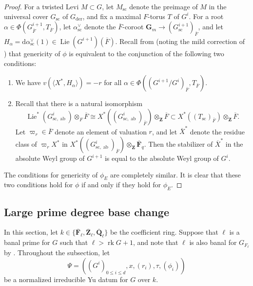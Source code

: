 \documentclass[reqno]{amsart}
\numberwithin{equation}{subsection}
\newcommand{\F}{\mathbf{F}}
\newcommand{\G}{\mathbf{G}}
\newcommand{\Q}{\mathbf{Q}}
\newcommand{\Z}{\mathbf{Z}}
\newcommand{\ol}[1]{\overline{#1}}
\DeclareMathOperator{\ab}{ab}
\DeclareMathOperator{\Lie}{Lie}
\DeclareMathOperator{\der}{der}
\DeclareMathOperator{\rk}{rk}
\DeclareMathOperator{\Fr}{Fr}
\theoremstyle{remark}
\numberwithin{equation}{subsection}
\numberwithin{figure}{subsection}
\begin{document}
\begin{proof}
For a twisted Levi $M \subset G$, let $M_{\mathrm{sc}}$ denote the preimage of $M$ in the universal cover $G_{\mathrm{sc}}$ of $G_{\der}$, and fix a maximal $F$-torus $T$ of $G^i$. For a root $\alpha \in \Phi(G^{i+1}_{\ol F}, T_{\ol F})$, let $\alpha_{\mathrm{sc}}^\vee$ denote the $\ol F$-coroot $\G_m \to (G^{i+1}_{\mathrm{sc}})_{\ol F}$, and let $H_\alpha = \mathrm{d}\alpha_{\mathrm{sc}}^\vee(1) \in \Lie(G^{i+1})(\ol F)$. Recall from \cite[\S 8]{Yu01} (noting the mild correction of \cite[Remark 4.1.3]{FKS23}) that genericity of $\phi$ is equivalent to the conjunction of the following two conditions:
\begin{enumerate}
    \item We have $v(\langle X^*, H_\alpha\rangle) = -r$ for all $\alpha \in \Phi((G^{i+1}/G^i)_{\ol F}, T_{\ol F})$.
    \item Recall that there is a natural isomorphism
    \[
    \Lie^*(G^i_{\mathrm{sc},\ab}) \otimes_F \ol F \cong X^*((G^i_{\mathrm{sc},\ab})_{\ol F}) \otimes_{\Z} \ol F \subset X^*((T_{\mathrm{sc}})_{\ol F}) \otimes_{\Z} \ol F.
    \]
    Let $\varpi_r \in \ol F$ denote an element of valuation $r$, and let $\ol X^*$ denote the residue class of $\varpi_r X^*$ in $X^*((G^i_{\mathrm{sc},\ab})_{\ol F}) \otimes_{\Z} \ol\F_q$. Then the stabilizer of $\ol X^*$ in the absolute Weyl group of $G^{i+1}$ is equal to the absolute Weyl group of $G^i$.
\end{enumerate}
The conditions for genericity of $\phi_E$ are completely similar. It is clear that these two conditions hold for $\phi$ if and only if they hold for $\phi_E$.
\end{proof}




\subsection{Large prime degree base change}\label{ss:large-prime-deg-bc-kal}

In this section, let $k\in\{\ol\F_\ell,\ol\Z_\ell,\ol\Q_\ell\}$ be the coefficient ring. Suppose that $\ell$ is a banal prime for $G$ such that $\ell > \rk G + 1$, and note that $\ell$ is also banal for $G_{F_\ell}$ by \cite[Proposition~4.1.2(2)]{Cot26b}. Throughout the subsection, let
\[
\Psi=((G^i)_{0\leq i\leq d},x,(r_i),\tau,(\phi_i))
\]
be a normalized irreducible Yu datum for $G$ over $k$.
\end{document}
